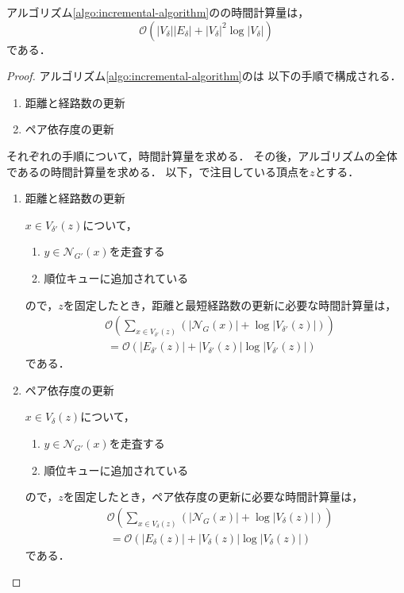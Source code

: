 \begin{lemma}
  アルゴリズム\ref{algo:incremental-algorithm}のの時間計算量は，
  \[ \mathcal{O}(\lvert V_\delta\rvert\lvert E_\delta\rvert
  +\lvert V_\delta\rvert^2\log \lvert V_\delta\rvert) \]
  である．
\end{lemma}
\begin{proof}
  アルゴリズム\ref{algo:incremental-algorithm}のは
  以下の手順で構成される．
  \begin{enumerate}[label=(\alph*)]
  \item 距離と経路数の更新
  \item ペア依存度の更新
  \end{enumerate}
  それぞれの手順について，時間計算量を求める．
  その後，アルゴリズムの全体であるの時間計算量を求める．
  以下，で注目している頂点を$z$とする．

  \begin{enumerate}[label=(\alph*)]
  \item 距離と経路数の更新
    \par $x\in V_{\delta'}(z)$について，
    \begin{enumerate}[label=\arabic*.]
    \item $y\in\mathcal{N}_{G'}(x)$を走査する
    \item 順位キューに追加されている
    \end{enumerate}
    ので，$z$を固定したとき，距離と最短経路数の更新に必要な時間計算量は，
    \begin{equation}
      \begin{aligned}
        &\mathcal{O}(\sum_{x\in V_{\delta'}(z)}(\lvert\mathcal{N}_G(x)\rvert
        +\log\lvert V_{\delta'}(z)\rvert)) \nonumber\\
        &\:=\mathcal{O}(\lvert E_{\delta'}(z)\rvert
        +\lvert V_{\delta'}(z)\rvert\log\lvert V_{\delta'}(z)\rvert) \nonumber
      \end{aligned}
    \end{equation}
    である．

  \item ペア依存度の更新
    \par $x\in V_\delta(z)$について，
    \begin{enumerate}[label=\arabic*.]
    \item $y\in\mathcal{N}_{G'}(x)$を走査する
    \item 順位キューに追加されている
    \end{enumerate}
    ので，$z$を固定したとき，ペア依存度の更新に必要な時間計算量は，
    \begin{equation}
      \begin{aligned}
        &\mathcal{O}(\sum_{x\in V_\delta(z)}(\lvert\mathcal{N}_G(x)\rvert
        +\log\lvert V_\delta(z)\rvert)) \nonumber\\
        &\:=\mathcal{O}(\lvert E_\delta(z)\rvert
        +\lvert V_\delta(z)\rvert\log\lvert V_\delta(z)\rvert) \nonumber
      \end{aligned}
    \end{equation}
    である．
  \end{enumerate}
  

\end{proof}
